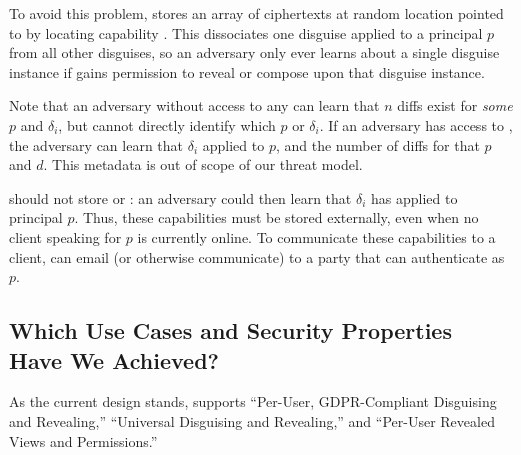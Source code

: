 To avoid this problem, \sys stores 
an array of  ciphertexts at random location pointed to by locating capability
.  This dissociates one disguise applied to a principal $p$ from all other
disguises, so an adversary only ever learns about a single disguise instance if \sys gains
permission to reveal or compose upon that disguise instance.

Note that an adversary without access to any  can learn that $n$ diffs exist for
\emph{some} $p$ and $\delta_i$, but cannot directly identify which $p$ or $\delta_i$.
If an adversary has access to , the adversary can learn that $\delta_i$
applied to $p$, and the number of  diffs for that $p$ and $d$. This metadata is out of scope of our threat model.

\sys should not store  or : an adversary could then
learn that $\delta_i$ has applied to principal $p$. Thus, these capabilities must be stored externally,
even when no client speaking for $p$ is currently online.
%
%
To communicate these capabilities to a client,
\sys can email (or otherwise communicate)  to a party that can authenticate as $p$. 

\subsection{Which Use Cases and Security Properties Have We Achieved?}
As the current design stands, \sys supports ``Per-User, GDPR-Compliant Disguising and
Revealing,'' ``Universal Disguising and Revealing,'' and ``Per-User Revealed Views and
Permissions.''

